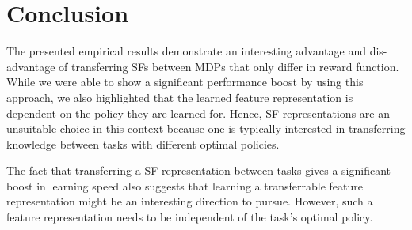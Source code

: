 \documentclass{article}
\begin{document}
\section{Conclusion}

The presented empirical results demonstrate an interesting advantage and dis-advantage of transferring SFs between MDPs that only differ in reward function.
While we were able to show a significant performance boost by using this approach, we also highlighted that the learned feature representation is dependent on the policy they are learned for.
Hence, SF representations are an unsuitable choice in this context because one is typically interested in transferring knowledge between tasks with different optimal policies.

The fact that transferring a SF representation between tasks gives a significant boost in learning speed also suggests that learning a transferrable feature representation might be an interesting direction to pursue.
However, such a feature representation needs to be independent of the task's optimal policy. 



\end{document}
